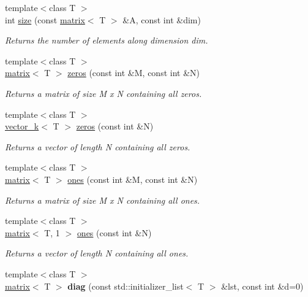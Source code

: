 \begin{DoxyCompactItemize}
\item 
{\footnotesize template$<$class T $>$ }\\int \hyperlink{namespacekeycpp_a2824156817719ffe96a842dd0ef27ae5}{size} (const \hyperlink{classkeycpp_1_1matrix}{matrix}$<$ T $>$ \&A, const int \&dim)
\begin{DoxyCompactList}\small\item\em Returns the number of elements along dimension dim. \end{DoxyCompactList}\item 
{\footnotesize template$<$class T $>$ }\\\hyperlink{classkeycpp_1_1matrix}{matrix}$<$ T $>$ \hyperlink{namespacekeycpp_a5699c522088657287bf0ac01173b716c}{zeros} (const int \&M, const int \&N)
\begin{DoxyCompactList}\small\item\em Returns a matrix of size M x N containing all zeros. \end{DoxyCompactList}\item 
{\footnotesize template$<$class T $>$ }\\\hyperlink{classkeycpp_1_1vector__k}{vector\-\_\-k}$<$ T $>$ \hyperlink{namespacekeycpp_ac00f5a8f1eba98722c1aac6b637a18c7}{zeros} (const int \&N)
\begin{DoxyCompactList}\small\item\em Returns a vector of length N containing all zeros. \end{DoxyCompactList}\item 
{\footnotesize template$<$class T $>$ }\\\hyperlink{classkeycpp_1_1matrix}{matrix}$<$ T $>$ \hyperlink{namespacekeycpp_a388f91a0ccf34978ef9403ccd0c680bf}{ones} (const int \&M, const int \&N)
\begin{DoxyCompactList}\small\item\em Returns a matrix of size M x N containing all ones. \end{DoxyCompactList}\item 
{\footnotesize template$<$class T $>$ }\\\hyperlink{classkeycpp_1_1matrix}{matrix}$<$ T, 1 $>$ \hyperlink{namespacekeycpp_ae9584728c5d3dc47dbedf4ca8f4dc4d2}{ones} (const int \&N)
\begin{DoxyCompactList}\small\item\em Returns a vector of length N containing all ones. \end{DoxyCompactList}\item 
\hypertarget{namespacekeycpp_a4bb3ea9a842383b82c889179f25be9ec}{{\footnotesize template$<$class T $>$ }\\\hyperlink{classkeycpp_1_1matrix}{matrix}$<$ T $>$ {\bfseries diag} (const std\-::initializer\-\_\-list$<$ T $>$ \&lst, const int \&d=0)}\label{namespacekeycpp_a4bb3ea9a842383b82c889179f25be9ec}


\end{DoxyCompactItemize}

